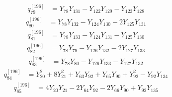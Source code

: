 \begin{equation}\label{q196:row:079}
\begin{aligned}
q_{79}^{[196]} &={} Y_{78}Y_{131} - Y_{122}Y_{129} - Y_{123}Y_{128}
\end{aligned}
\end{equation}
\begin{equation}\label{q196:row:080}
\begin{aligned}
q_{80}^{[196]} &={} Y_{78}Y_{132} - Y_{124}Y_{130} - 2Y_{125}Y_{131}
\end{aligned}
\end{equation}
\begin{equation}\label{q196:row:081}
\begin{aligned}
q_{81}^{[196]} &={} Y_{78}Y_{133} - Y_{124}Y_{131} - Y_{125}Y_{130}
\end{aligned}
\end{equation}
\begin{equation}\label{q196:row:082}
\begin{aligned}
q_{82}^{[196]} &={} Y_{78}Y_{79} - Y_{126}Y_{132} - 2Y_{127}Y_{133}
\end{aligned}
\end{equation}
\begin{equation}\label{q196:row:083}
\begin{aligned}
q_{83}^{[196]} &={} Y_{78}Y_{80} - Y_{126}Y_{133} - Y_{127}Y_{132}
\end{aligned}
\end{equation}
\begin{equation}\label{q196:row:084}
\begin{aligned}
q_{84}^{[196]} &={} Y_{20}^{2} + 8Y_{21}^{2} + Y_{63}Y_{92} + Y_{65}Y_{90} + Y_{92}^{2} - Y_{92}Y_{134}
\end{aligned}
\end{equation}
\begin{equation}\label{q196:row:085}
\begin{aligned}
q_{85}^{[196]} &={} 4Y_{20}Y_{21} - 2Y_{64}Y_{92} - 2Y_{66}Y_{90} + Y_{92}Y_{135}
\end{aligned}
\end{equation}
